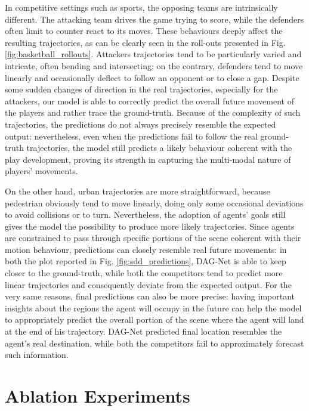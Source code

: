 \documentclass[10pt,a4paper,conference]{IEEEtran}
\begin{document}
In competitive settings such as sports, the opposing teams are intrinsically different. The attacking team drives the game trying to score, while the defenders often limit to counter react to its moves. These behaviours deeply affect the resulting trajectories, as can be clearly seen in the roll-outs presented in Fig. \ref{fig:basketball_rollouts}. Attackers trajectories tend to be particularly varied and intricate, often bending and intersecting; on the contrary, defenders tend to move linearly and occasionally deflect to follow an opponent or to close a gap. Despite some sudden changes of direction in the real trajectories, especially for the attackers, our model is able to correctly predict the overall future movement of the players and rather trace the ground-truth. Because of the complexity of such trajectories, the predictions do not always precisely resemble the expected output: nevertheless, even when the predictions fail to follow the real ground-truth trajectories, the model still predicts a likely behaviour coherent with the play development, proving its strength in capturing the multi-modal nature of players' movements. 


On the other hand, urban trajectories are more straightforward, because pedestrian obviously tend to move linearly, doing only some occasional deviations to avoid collisions or to turn. Nevertheless, the adoption of agents' goals still gives the model the possibility to produce more likely trajectories. Since agents are constrained to pass through specific portions of the scene coherent with their motion behaviour, predictions can closely resemble real future movements: in both the plot reported in Fig. \ref{fig:sdd_predictions}, DAG-Net is able to keep closer to the ground-truth, while both the competitors tend to predict more linear trajectories and consequently deviate from the expected output.
For the very same reasons, final predictions can also be more precise: having important insights about the regions the agent will occupy in the future can help the model to appropriately predict the overall portion of the scene where the agent will land at the end of his trajectory. DAG-Net predicted final location resembles the agent's real destination, while both the competitors fail to approximately forecast such information. \section{Ablation Experiments}
\end{document}
